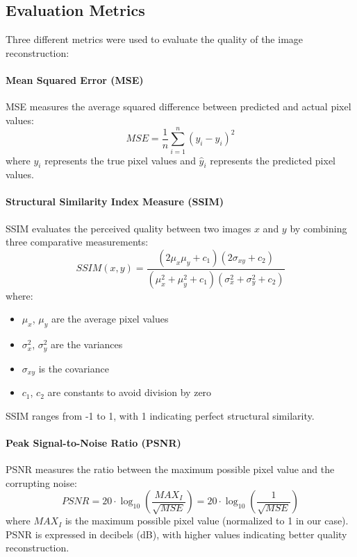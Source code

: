\documentclass{article}
\begin{document}
\begin{appendices}
\section{Evaluation Metrics} \label{app:evaluation_metrics}
Three different metrics were used to evaluate the quality of the image reconstruction:

\paragraph{Mean Squared Error (MSE)}
MSE measures the average squared difference between predicted and actual pixel values:
\begin{equation}
    MSE = \frac{1}{n} \sum_{i=1}^{n} (y_i - \hat{y}_i)^2
\end{equation}
where $y_i$ represents the true pixel values and $\hat{y}_i$ represents the predicted pixel values.

\paragraph{Structural Similarity Index Measure (SSIM)}
SSIM evaluates the perceived quality between two images $x$ and $y$ by combining three comparative measurements:
\begin{equation}
    SSIM(x,y) = \frac{(2\mu_x\mu_y + c_1)(2\sigma_{xy} + c_2)}{(\mu_x^2 + \mu_y^2 + c_1)(\sigma_x^2 + \sigma_y^2 + c_2)}
\end{equation}
where:
\begin{itemize}
    \item $\mu_x$, $\mu_y$ are the average pixel values
    \item $\sigma_x^2$, $\sigma_y^2$ are the variances
    \item $\sigma_{xy}$ is the covariance
    \item $c_1$, $c_2$ are constants to avoid division by zero
\end{itemize}
SSIM ranges from -1 to 1, with 1 indicating perfect structural similarity.

\paragraph{Peak Signal-to-Noise Ratio (PSNR)}
PSNR measures the ratio between the maximum possible pixel value and the corrupting noise:
\begin{equation}
    PSNR = 20 \cdot \log_{10}\left(\frac{MAX_I}{\sqrt{MSE}}\right) = 20 \cdot \log_{10}\left(\frac{1}{\sqrt{MSE}}\right)
\end{equation}
where $MAX_I$ is the maximum possible pixel value (normalized to 1 in our case). PSNR is expressed in decibels (dB), with higher values indicating better quality reconstruction.


\end{appendices}
\end{document}
